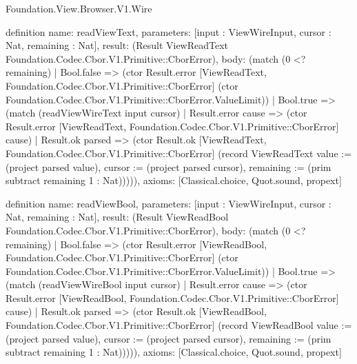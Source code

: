 \begin{lexlean}{Foundation.View.Browser.V1.Wire}
\begin{semanticmodule}
definition{
  name: readViewText,
  parameters: [input : ViewWireInput, cursor : Nat, remaining : Nat],
  result: (Result ViewReadText Foundation.Codec.Cbor.V1.Primitive::CborError),
  body: (match (0 <? remaining)
    | Bool.false => (ctor Result.error [ViewReadText, Foundation.Codec.Cbor.V1.Primitive::CborError] (ctor Foundation.Codec.Cbor.V1.Primitive::CborError.ValueLimit))
    | Bool.true => (match (readViewWireText input cursor)
      | Result.error cause => (ctor Result.error [ViewReadText, Foundation.Codec.Cbor.V1.Primitive::CborError] cause)
      | Result.ok parsed => (ctor Result.ok [ViewReadText, Foundation.Codec.Cbor.V1.Primitive::CborError] (record ViewReadText {value := (project parsed value), cursor := (project parsed cursor), remaining := (prim subtract remaining 1 : Nat)})))),
  axioms: [Classical.choice, Quot.sound, propext]
}

definition{
  name: readViewBool,
  parameters: [input : ViewWireInput, cursor : Nat, remaining : Nat],
  result: (Result ViewReadBool Foundation.Codec.Cbor.V1.Primitive::CborError),
  body: (match (0 <? remaining)
    | Bool.false => (ctor Result.error [ViewReadBool, Foundation.Codec.Cbor.V1.Primitive::CborError] (ctor Foundation.Codec.Cbor.V1.Primitive::CborError.ValueLimit))
    | Bool.true => (match (readViewWireBool input cursor)
      | Result.error cause => (ctor Result.error [ViewReadBool, Foundation.Codec.Cbor.V1.Primitive::CborError] cause)
      | Result.ok parsed => (ctor Result.ok [ViewReadBool, Foundation.Codec.Cbor.V1.Primitive::CborError] (record ViewReadBool {value := (project parsed value), cursor := (project parsed cursor), remaining := (prim subtract remaining 1 : Nat)})))),
  axioms: [Classical.choice, Quot.sound, propext]
}


\end{semanticmodule}
\end{lexlean}

